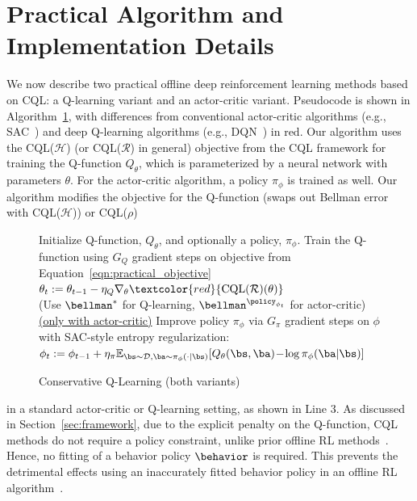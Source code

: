 \section{Practical Algorithm and Implementation Details}
\label{sec:practical_alg}
\vspace{-5pt}
We now describe two practical offline deep reinforcement learning methods based on CQL: a Q-learning variant and an actor-critic variant. Pseudocode is shown in Algorithm~\ref{alg:practical_alg}, with differences from conventional actor-critic algorithms (e.g., SAC~\citep{haarnoja}) and deep Q-learning algorithms (e.g., DQN~\citep{mnih2013playing}) in red.
Our algorithm uses the CQL($\mathcal{H}$) (or CQL($\mathcal{R}$) in general) objective from the CQL framework for training the Q-function $Q_\theta$, which is parameterized by a neural network with parameters $\theta$. For the actor-critic algorithm, a policy $\pi_\phi$ is trained as well. Our algorithm modifies the objective for the Q-function (swaps out Bellman error with CQL($\mathcal{H}$)) or CQL($\rho$)
\begin{figure}
\begin{small}
\vspace{-23pt}
\begin{minipage}[t]{0.99\linewidth}
\begin{algorithm}[H]
\small
\caption{Conservative Q-Learning (both variants)}
\label{alg:practical_alg}
\begin{algorithmic}[1]
    \STATE Initialize Q-function, $Q_\theta$, and optionally a policy, $\pi_\phi$.
        \STATE Train the Q-function using $G_Q$ gradient steps on objective from Equation~\ref{eqn:practical_objective} \\
        \mbox{$\theta_t := \theta_{t-1} - \eta_Q \nabla_\theta \textcolor{red}{\text{CQL}(\mathcal{R})(\theta)}$}\\
        (Use $\bellman^*$ for Q-learning, $\bellman^{\policy_{\phi_t}}$ for actor-critic)
        \STATE \underline{(only with actor-critic)} Improve policy $\pi_\phi$ via $G_\pi$ gradient steps on $\phi$ with SAC-style entropy regularization:\\
        \mbox{$\phi_{t} := \phi_{t-1} + \eta_\pi \mathbb{E}_{\bs \sim \mathcal{D}, \ba \sim \pi_\phi(\cdot|\bs)}[Q_\theta(\bs, \ba)\! -\! \log \pi_\phi(\ba|\bs)] $}
    \ENDFOR
\end{algorithmic}
\end{algorithm}
\end{minipage}
\vspace{-15pt}
\end{small}
\end{figure}
in a standard actor-critic or Q-learning setting, as shown in Line 3. As discussed in Section~\ref{sec:framework}, due to the explicit penalty on the Q-function, CQL methods do not require a policy constraint,
unlike prior offline RL methods~\citep{kumar2019stabilizing,wu2019behavior,siegel2020keep,levine2020offline}.
Hence, no fitting of a behavior policy $\behavior$ is required. This prevents the detrimental effects using an inaccurately fitted behavior policy in an offline RL algorithm~\citep{levine2020offline}.

